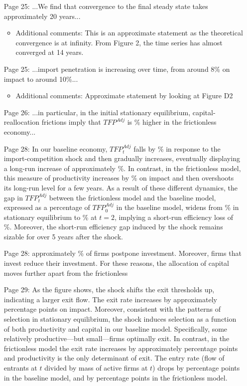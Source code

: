 \documentclass[12pt]{article}
\begin{document}
\begin{itemize}
\begin{itemize}
	\end{itemize}
	\item [Page 25:] ...We find that convergence to the final steady state takes approximately 20 years...
	\begin{itemize}
		\item Additional comments: This is an approximate statement as the theoretical convergence is at infinity. From Figure 2, the time series has almost converged at 14 years.
	\end{itemize}
	\item [Page 25:] ...import penetration is increasing over time, from around 8\% on impact to around 10\%...
	\begin{itemize}
		\item Additional comments: Approximate statement by looking at Figure D2
	\end{itemize}
	\item [Page 26:] ...in particular, in the initial stationary equilibrium, capital-reallocation frictions imply that $TFP^{Adj}$ is \ssTFPratio\% higher in the frictionless economy...
	\item [Page 28:] In our baseline economy, $TFP^{Adj}_t$ falls by \TFPdBaseline\% in response to the import-competition shock and then gradually increases, eventually displaying a long-run increase of approximately \tfpgainsLR\%. In contrast, in the frictionless model, this measure of productivity increases by \TFPdFrictionless\% on impact and then overshoots its long-run level for a few years. As a result of these different dynamics, the gap in $TFP^{Adj}_t$ between the frictionless model and the baseline model, expressed as a percentage of $TFP^{Adj}_0$ in the baseline model, widens from \ssTFPratio\% in stationary equilibrium to \SRTFPratio\% at $t=2$, implying a short-run efficiency loss of \effgap\%. Moreover, the short-run efficiency gap induced by the shock remains sizable for over 5 years after the shock.
	\item [Page 28:] approximately \inactPospp\% of firms postpone investment. Moreover, firms that invest reduce their investment. For these reasons, the allocation of capital moves further apart from the frictionless
	\item [Page 29:] As the figure shows, the shock shifts the exit thresholds up, indicating a larger exit flow. The exit rate increases by approximately \exitSR \space percentage points on impact. Moreover, consistent with the patterns of selection in stationary equilibrium, the shock induces selection as a function of both productivity and capital in our baseline model. Specifically, some relatively productive---but small---firms optimally exit. In contrast, in the frictionless model the exit rate increases by approximately \exitSRfrictionless \space percentage points and productivity is the only determinant of exit. The entry rate (flow of entrants at $t$ divided by mass of active firms at $t$) drops by \entrySR \space percentage points in the baseline model, and by \entrySRfrictionless \space percentage points in the frictionless model. 

\end{itemize}
\end{document}
